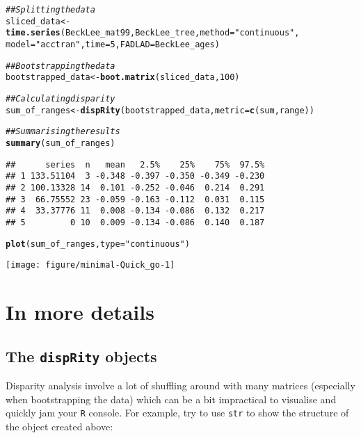 \documentclass{article}\usepackage[]{graphicx}\usepackage[]{color}
\makeatletter
\newcommand{\hlnum}[1]{\textcolor[rgb]{0.686,0.059,0.569}{#1}}%
\newcommand{\hlstr}[1]{\textcolor[rgb]{0.192,0.494,0.8}{#1}}%
\newcommand{\hlcom}[1]{\textcolor[rgb]{0.678,0.584,0.686}{\textit{#1}}}%
\newcommand{\hlstd}[1]{\textcolor[rgb]{0.345,0.345,0.345}{#1}}%
\newcommand{\hlkwb}[1]{\textcolor[rgb]{0.69,0.353,0.396}{#1}}%
\newcommand{\hlkwc}[1]{\textcolor[rgb]{0.333,0.667,0.333}{#1}}%
\newcommand{\hlkwd}[1]{\textcolor[rgb]{0.737,0.353,0.396}{\textbf{#1}}}%
\newenvironment{kframe}{%
 \def\at@end@of@kframe{}%
 \ifinner\ifhmode%
  \def\at@end@of@kframe{\end{minipage}}%
  \begin{minipage}{\columnwidth}%
 \fi\fi%
 \def\FrameCommand##1{\hskip\@totalleftmargin \hskip-\fboxsep
 \colorbox{shadecolor}{##1}\hskip-\fboxsep
     \hskip-\linewidth \hskip-\@totalleftmargin \hskip\columnwidth}%
 \MakeFramed {\advance\hsize-\width
   \@totalleftmargin\z@ \linewidth\hsize
   \@setminipage}}%
 {\par\unskip\endMakeFramed%
 \at@end@of@kframe}
\newenvironment{knitrout}{}{} %
\newcommand{\dispRity}{\texttt{dispRity} }
\newcommand{\R}{\texttt{R} }
\makeatother
\begin{document}
\begin{knitrout}
\color{fgcolor}\begin{kframe}
\begin{alltt}
\hlcom{## Splitting the data}
\hlstd{sliced_data} \hlkwb{<-} \hlkwd{time.series}\hlstd{(BeckLee_mat99, BeckLee_tree,} \hlkwc{method} \hlstd{=} \hlstr{"continuous"}\hlstd{,}
    \hlkwc{model} \hlstd{=} \hlstr{"acctran"}\hlstd{,} \hlkwc{time} \hlstd{=} \hlnum{5}\hlstd{,} \hlkwc{FADLAD} \hlstd{= BeckLee_ages)}
\end{alltt}


{\ttfamily\noindent\itshape\color{messagecolor}{\#\# Some tips have FAD/LAD and are assumed to interval single points in time.}}\begin{alltt}
\hlcom{## Bootstrapping the data}
\hlstd{bootstrapped_data} \hlkwb{<-} \hlkwd{boot.matrix}\hlstd{(sliced_data,} \hlnum{100}\hlstd{)}

\hlcom{## Calculating disparity}
\hlstd{sum_of_ranges} \hlkwb{<-} \hlkwd{dispRity}\hlstd{(bootstrapped_data,} \hlkwc{metric} \hlstd{=} \hlkwd{c}\hlstd{(sum, range))}

\hlcom{## Summarising the results}
\hlkwd{summary}\hlstd{(sum_of_ranges)}
\end{alltt}
\begin{verbatim}
##      series  n   mean   2.5%    25%    75%  97.5%
## 1 133.51104  3 -0.348 -0.397 -0.350 -0.349 -0.230
## 2 100.13328 14  0.101 -0.252 -0.046  0.214  0.291
## 3  66.75552 23 -0.059 -0.163 -0.112  0.031  0.115
## 4  33.37776 11  0.008 -0.134 -0.086  0.132  0.217
## 5         0 10  0.009 -0.134 -0.086  0.140  0.187
\end{verbatim}
\begin{alltt}
\hlkwd{plot}\hlstd{(sum_of_ranges,} \hlkwc{type} \hlstd{=} \hlstr{"continuous"}\hlstd{)}
\end{alltt}
\end{kframe}

{\centering \texttt{[image: figure/minimal-Quick\_go-1]} 

}



\end{knitrout}


\section{In more details}

\subsection{The \dispRity objects}
Disparity analysis involve a lot of shuffling around with many matrices (especially when bootstrapping the data) which can be a bit impractical to visualise and quickly jam your \R console.
For example, try to use \texttt{str} to show the structure of the object created above:
\end{document}

